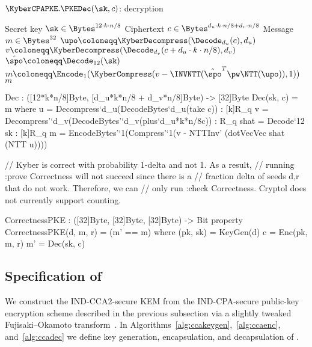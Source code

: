 \begin{algorithm}
  \caption{$\KyberCPAPKE.\PKEDec(\sk,c)$: decryption\label{kybercpa-dec}}
  \begin{algorithmic}[1]
    \Require Secret key $\sk \in \Bytes^{12\cdot k\cdot n/8}$
    \Require Ciphertext $c \in \Bytes^{d_u\cdot k\cdot n/8 + d_v\cdot n/8}$
    \Ensure Message $m \in \Bytes^{32}$
    \State $\upo \coloneqq \KyberDecompress(\Decode_{d_u}(c),d_u)$
    \State $v \coloneqq \KyberDecompress(\Decode_{d_v}(c+d_u\cdot k\cdot n/8),d_v)$
    \State $\hat{\spo} \coloneqq \Decode_{12}(\sk)$
    \State $m \coloneqq \Encode_1(\KyberCompress(v-\INVNTT(\hat{\spo}^T\pw\NTT(\upo)),1))$ \label{line:decrypt} 
    \State \Return $m$
\end{algorithmic}
\end{algorithm}

\begin{code}
  Dec : ([12*k*n/8]Byte, [d_u*k*n/8 + d_v*n/8]Byte) -> [32]Byte
  Dec(sk, c) = m where
    u = Decompress`{d_u}(DecodeBytes`{d_u}(take c))   : [k]R_q
    v = Decompress'`{d_v}(DecodeBytes'`{d_v}(plus`{d_u*k*n/8}c)) : R_q
    shat = Decode`{12} sk : [k]R_q
    m = EncodeBytes'`{1}(Compress'`{1}(v - NTTInv' (dotVecVec shat (NTT u))))

  // Kyber is correct with probability 1-delta and not 1. As a result,
  // running :prove Correctness will not succeed since there is a 
  // fraction delta of seeds d,r that do not work. Therefore, we can 
  // only run :check Correctness. Cryptol does not currently support counting.

  CorrectnessPKE : ([32]Byte, [32]Byte, [32]Byte) -> Bit
  property CorrectnessPKE(d, m, r) = (m' == m) where
    (pk, sk) = KeyGen(d)
    c = Enc(pk, m, r)
    m' = Dec(sk, c)
\end{code}

\clearpage

\subsection{Specification of \KyberCCAKEM}
\label{subsec:specification:ccakem}

We construct the \KyberCCAKEM IND-CCA2-secure KEM from the IND-CPA-secure
public-key encryption scheme described in the previous subsection via a slightly
tweaked Fujisaki--Okamoto transform~\cite{C:FujOka99}. 
In Algorithms~\ref{alg:ccakeygen},~\ref{alg:ccaenc}, and~\ref{alg:ccadec}
we define key generation, encapsulation, and decapsulation of \KyberCCAKEM.

